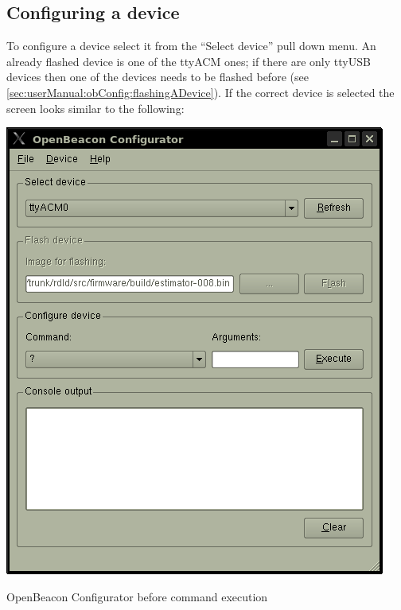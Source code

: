   \subsection{Configuring a device}
   To configure a device select it from the ``Select device'' pull down menu. An already flashed device is one of the ttyACM ones; if there are only ttyUSB devices then one of the devices needs to be flashed before (see \ref{sec:userManual:obConfig:flashingADevice}). If the correct device is selected the screen looks similar to the following:
   \begin{staticFigure}
    \begin{center}
     \includegraphics{images/UserManual/obConfig/mainWindow-beforeCommandExe.png}
     \caption{OpenBeacon Configurator before command execution}
     \label{fg:userManual:obConfig:mainWindow-beforeCommandExe}
    \end{center}
   \end{staticFigure}

